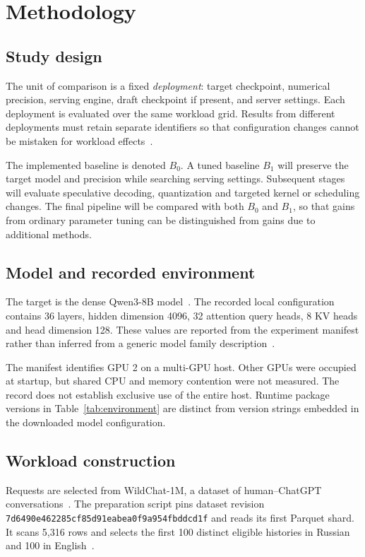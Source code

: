 \chapter{Methodology}
\label{chap:met}

\section{Study design}
The unit of comparison is a fixed \emph{deployment}: target checkpoint, numerical precision, serving engine, draft checkpoint if present, and server settings. Each deployment is evaluated over the same workload grid. Results from different deployments must retain separate identifiers so that configuration changes cannot be mistaken for workload effects~\cite{procedure}.

The implemented baseline is denoted $B_0$. A tuned baseline $B_1$ will preserve the target model and precision while searching serving settings. Subsequent stages will evaluate speculative decoding, quantization and targeted kernel or scheduling changes. The final pipeline will be compared with both $B_0$ and $B_1$, so that gains from ordinary parameter tuning can be distinguished from gains due to additional methods.

\section{Model and recorded environment}
The target is the dense Qwen3-8B model~\cite{qwenmodel,qwenreport}. The recorded local configuration contains 36 layers, hidden dimension 4096, 32 attention query heads, 8 KV heads and head dimension 128. These values are reported from the experiment manifest rather than inferred from a generic model family description~\cite{baseline}.



The manifest identifies GPU 2 on a multi-GPU host. Other GPUs were occupied at startup, but shared CPU and memory contention were not measured. The record does not establish exclusive use of the entire host. Runtime package versions in Table~\ref{tab:environment} are distinct from version strings embedded in the downloaded model configuration.


\section{Workload construction}
Requests are selected from WildChat-1M, a dataset of human--ChatGPT conversations~\cite{wildchat}. The preparation script pins dataset revision \nolinkurl{7d6490e462285cf85d91eabea0f9a954fbddcd1f} and reads its first Parquet shard. It scans 5,316 rows and selects the first 100 distinct eligible histories in Russian and 100 in English~\cite{procedure,repo}.

